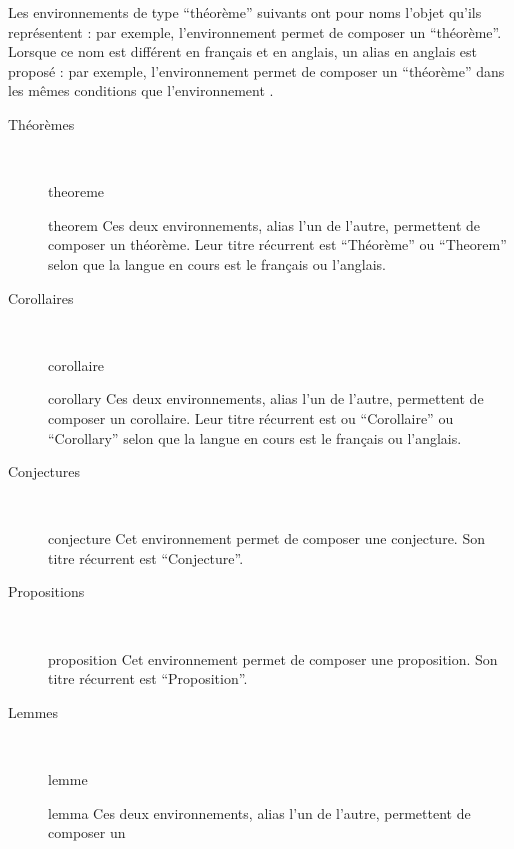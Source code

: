 Les environnements de type \enquote{théorème} suivants ont pour noms l'objet
qu'ils représentent : par exemple, l'environnement  permet de
composer un \enquote{théorème}. Lorsque ce nom est différent en français et en
anglais, un alias en anglais est proposé : par exemple, l'environnement
 permet de composer un \enquote{théorème} dans les mêmes
conditions que l'environnement .

\begin{description}
\item[Théorèmes] \
  \begin{docEnvironment}{theoreme}{}
  \end{docEnvironment}
  \begin{docEnvironment}{theorem}{}
    Ces deux environnements, alias l'un de l'autre, permettent de composer un
    théorème. Leur titre récurrent est \enquote{Th\'eor\`eme} ou
    \enquote{Theorem} selon que la langue en cours est le français ou l'anglais.
  \end{docEnvironment}
\item[Corollaires] \
  \begin{docEnvironment}{corollaire}{}
  \end{docEnvironment}
  \begin{docEnvironment}{corollary}{}
    Ces deux environnements, alias l'un de l'autre, permettent de composer un
    corollaire. Leur titre récurrent est ou \enquote{Corollaire} ou
    \enquote{Corollary} selon que la langue en cours est le français ou
    l'anglais.
  \end{docEnvironment}
\item[Conjectures] \
  \begin{docEnvironment}{conjecture}{}
    Cet environnement permet de composer une conjecture. Son titre récurrent est
    \enquote{Conjecture}.
  \end{docEnvironment}
\item[Propositions] \
  \begin{docEnvironment}{proposition}{}
    Cet environnement permet de composer une proposition. Son titre récurrent
    est \enquote{Proposition}.
  \end{docEnvironment}
\item[Lemmes] \
  \begin{docEnvironment}{lemme}{}
  \end{docEnvironment}
  \begin{docEnvironment}{lemma}{}
    Ces deux environnements, alias l'un de l'autre, permettent de composer un

\end{docEnvironment}
\end{description}
